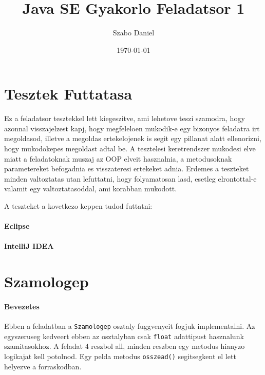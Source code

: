 \documentclass{article}
\title{Java SE Gyakorlo Feladatsor 1}
\author{Szabo Daniel}
\date{\today}
\begin{document}
    \maketitle
    \begin{abstract}

    \end{abstract}
    \tableofcontents{}

    \newpage


    \section{Tesztek Futtatasa}

    Ez a feladatsor tesztekkel lett kiegeszitve, ami lehetove teszi szamodra, hogy azonnal visszajelzest kapj, hogy megfeleloen mukodik-e egy bizonyos feladatra irt megoldasod, illetve a megoldas ertekelojenek is segit egy pillanat alatt ellenorizni, hogy mukodokepes megoldast adtal be. A tesztelesi keretrendszer mukodesi elve miatt a feladatoknak muszaj az OOP elveit hasznalnia, a metodusoknak parametereket befogadnia es visszateresi ertekeket adnia. Erdemes a teszteket minden valtoztatas utan lefuttatni, hogy folyamatosan lasd, esetleg elrontottal-e valamit egy valtoztatasoddal, ami korabban mukodott.

    A teszteket a kovetkezo keppen tudod futtatni:

    \paragraph{Eclipse}

    \paragraph{IntelliJ IDEA}


    \section{Szamologep}

    \paragraph{Bevezetes}

    Ebben a feladatban a \lstinline{Szamologep} osztaly fuggvenyeit fogjuk implementalni. Az egyszeruseg kedveert ebben az osztalyban csak \lstinline{float} adattipust hasznalunk szamitasokhoz. A feladat 4 reszbol all, minden reszben egy metodus hianyzo logikajat kell potolnod. Egy pelda metodus \lstinline{osszead()} segitsegkent el lett helyezve a forraskodban.
\end{document}
